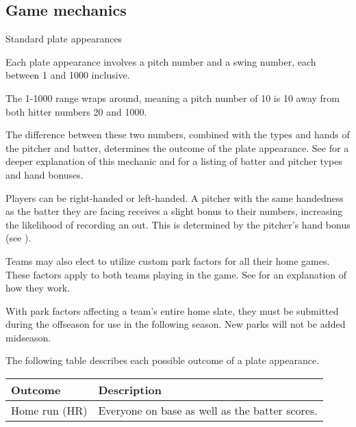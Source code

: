 
\subsection{Game mechanics}
\begin{deepEnumerate}
	\item Standard plate appearances
	\begin{deepEnumerate}
		\item Each plate appearance involves a pitch number and a swing number, each between 1 and 1000 inclusive.
		\item The 1-1000 range wraps around, meaning a pitch number of 10 is 10 away from both hitter numbers 20 and 1000.
		\item The difference between these two numbers, combined with the types and hands of the pitcher and batter, 
		determines the outcome of the plate appearance. 
		See  for a deeper explanation of this mechanic 
		and for a listing of batter and pitcher types and hand bonuses.
		\item Players can be right-handed or left-handed. 
		A pitcher with the same handedness as the batter they are facing receives a slight bonus to their numbers, 
		increasing the likelihood of recording an out. 
		This is determined by the pitcher’s hand bonus (see ).
		\item Teams may also elect to utilize custom park factors for all their home games. 
		These factors apply to both teams playing in the game. 
		See  for an explanation of how they work.
		\begin{deepEnumerate}
			\item With park factors affecting a team’s entire home slate, 
			they must be submitted during the offseason for use in the following season. 
			New parks will not be added midseason.
		\end{deepEnumerate}
		\item The following table describes each possible outcome of a plate appearance.
		\begin{center}
			\begin{longtable}{|p{3cm}|p{8cm}|}
				\hline
				\textbf{Outcome}           & \textbf{Description}                                                  \\
				\hline
				Home run (HR)              & Everyone on base as well as the batter scores.                        \\

\end{longtable}
\end{center}
\end{deepEnumerate}
\end{deepEnumerate}
